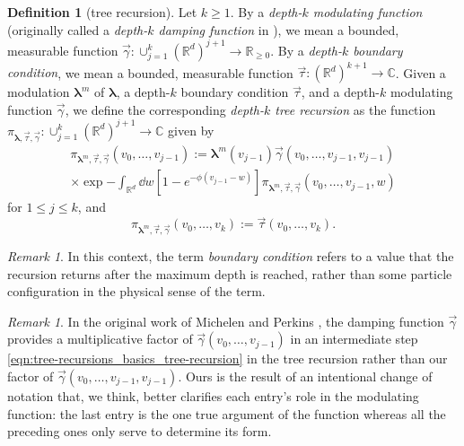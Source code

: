\documentclass[11pt]{article}
\newcommand{\R}{\mathbb R}
\newcommand{\C}{\mathbb C}
\newcommand{\bl}{\bm{\lambda}}
\numberwithin{equation}{section}
\theoremstyle{plain}
\theoremstyle{definition}
\newtheorem{definition}[theorem]{Definition}
\theoremstyle{remark}
\newtheorem{remark}[theorem]{Remark}
\begin{document}
\begin{definition}[tree recursion]
Let $k\ge 1$.
By a \emph{depth-$k$ modulating function} (originally called a \emph{depth-$k$ damping function} in \cite{michelen2023analyticity}), we mean a bounded, measurable function $\vec{\gamma}:\cup_{j=1}^{k}(\R^{d})^{j+1}\rightarrow\R_{\ge 0}$.
By a \emph{depth-$k$ boundary condition}, we mean a bounded, measurable function $\vec{\tau}:(\R^{d})^{k+1}\rightarrow\C$.
Given a modulation $\bl^{m}$ of $\bl$, a depth-$k$ boundary condition $\vec{\tau}$, and a depth-$k$ modulating function $\vec{\gamma}$, we define the corresponding \emph{depth-$k$ tree recursion} as the function $\pi_{\bl,\vec{\tau},\vec{\gamma}}:\cup_{j=1}^{k}(\R^{d})^{j+1}\rightarrow\C$ given by
\begin{equation}
\label{eqn:tree-recursions_basics_tree-recursion}
\begin{multlined}
\pi_{\bl^{m},\vec{\tau},\vec{\gamma}}(v_{0},\dots,v_{j-1}):=
\bl^{m}(v_{j-1})\vec{\gamma}(v_{0},\dots,v_{j-1},v_{j-1})
\\
\times\exp{-\int_{\R^{d}}\dd{w}\left[1-e^{-\phi(v_{j-1}-w)}\right]\pi_{\bl^{m},\vec{\tau},\vec{\gamma}}(v_{0},\dots,v_{j-1},w)}
\end{multlined}
\end{equation}
for $1\le j\le k$, and
\begin{equation}
\pi_{\bl^{m},\vec{\tau},\vec{\gamma}}(v_{0},\dots,v_{k}):=\vec{\tau}(v_{0},\dots,v_{k}).
\end{equation}
\end{definition}

\begin{remark}
In this context, the term \emph{boundary condition} refers to a value that the recursion returns after the maximum depth is reached, rather than some particle configuration in the physical sense of the term.
\end{remark}

\begin{remark}
In the original work of Michelen and Perkins \cite{michelen2023analyticity}, the damping function $\vec{\gamma}$ provides a multiplicative factor of $\vec{\gamma}(v_{0},\dots,v_{j-1})$ in an intermediate step \eqref{eqn:tree-recursions_basics_tree-recursion} in the tree recursion rather than our factor of $\vec{\gamma}(v_{0},\dots,v_{j-1},v_{j-1})$.
Ours is the result of an intentional change of notation that, we think, better clarifies each entry's role in the modulating function: the last entry is the one true argument of the function whereas all the preceding ones only serve to determine its form.
\end{remark}
\end{document}
